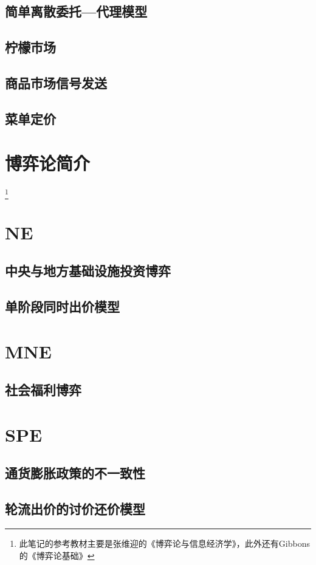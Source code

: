 \documentclass{article}
\begin{document}
\subsection{简单离散委托—代理模型}
\subsection{柠檬市场}
\subsection{商品市场信号发送}
\subsection{菜单定价}


\section{博弈论简介} \footnote{此笔记的参考教材主要是张维迎的《博弈论与信息经济学》，此外还有Gibbons的《博弈论基础》}
\section{NE}
\subsection{中央与地方基础设施投资博弈}

\subsection{单阶段同时出价模型}
\section{MNE}
\subsection{社会福利博弈}
\section{SPE}
\subsection{通货膨胀政策的不一致性}
\subsection{轮流出价的讨价还价模型}
\end{document}
